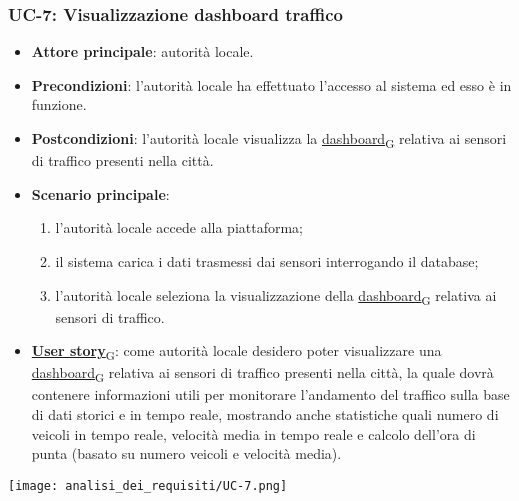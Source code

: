 \subsubsection{UC-7: Visualizzazione dashboard traffico}
\begin{itemize}
	\item \textbf{Attore principale}: autorità locale.
	\item \textbf{Precondizioni}: l'autorità locale ha effettuato l'accesso al sistema ed esso è in funzione.
	\item \textbf{Postcondizioni}: l'autorità locale visualizza la \href{https://7last.github.io/docs/rtb/documentazione-interna/glossario\#dashboard}{dashboard\textsubscript{G}} relativa
	      ai sensori di traffico presenti nella città.
	\item \textbf{Scenario principale}:
	      \begin{enumerate}
		      \item l'autorità locale accede alla piattaforma;
		      \item il sistema carica i dati trasmessi dai sensori interrogando il database;
		      \item l'autorità locale seleziona la visualizzazione della \href{https://7last.github.io/docs/rtb/documentazione-interna/glossario\#dashboard}{dashboard\textsubscript{G}} relativa ai sensori di traffico.
	      \end{enumerate}
	\item \href{https://7last.github.io/docs/rtb/documentazione-interna/glossario\#user-story}{\textbf{User story}\textsubscript{G}}:
	      come autorità locale desidero poter visualizzare una \href{https://7last.github.io/docs/rtb/documentazione-interna/glossario\#dashboard}{dashboard\textsubscript{G}} relativa ai sensori di traffico presenti nella città, la quale
	      dovrà contenere informazioni utili per monitorare l'andamento del traffico sulla base di dati storici e in tempo reale, mostrando
	      anche statistiche quali numero di veicoli in tempo reale, velocità media in tempo reale e calcolo dell'ora di punta (basato su numero veicoli e velocità media).
\end{itemize}
\begin{center}
	\texttt{[image: analisi\_dei\_requisiti/UC-7.png]}
\end{center}

